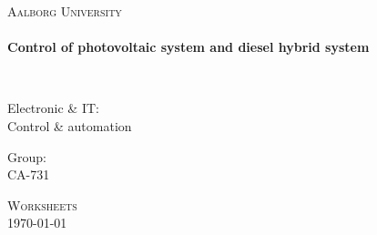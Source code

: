 %

\thispagestyle{empty}

\begin{center}

\vspace*{\fill}

\textsc{\LARGE Aalborg University}\\[1.0cm]

\HRule \\[0.4cm]
{ \HUGE \bfseries  Control of photovoltaic system and diesel hybrid system \\[0.5cm] }

\HRule \\[1.5cm]%


\begin{minipage}{0.4\textwidth}
\begin{flushleft} \large
Electronic \& IT:\\
Control \& automation
\end{flushleft}
\end{minipage}
\begin{minipage}{0.4\textwidth}
\begin{flushright} \large
Group: \\
CA-731
\end{flushright}
\end{minipage}

\vspace*{\fill}

\textsc{\Large Worksheets}\\[1.0cm]

{\large \today}

\end{center}